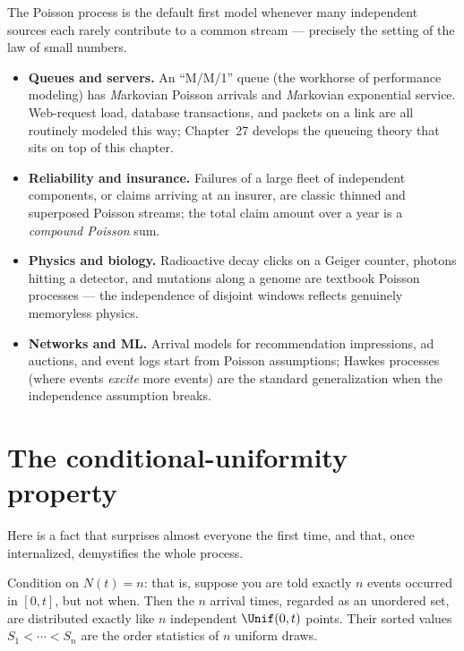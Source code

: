 \begin{applicationbox}
The Poisson process is the default first model whenever many independent sources
each rarely contribute to a common stream --- precisely the setting of the law of
small numbers.
\begin{itemize}
\item \textbf{Queues and servers.} An ``M/M/1'' queue (the workhorse of
performance modeling) has \emph{M}arkovian Poisson arrivals and \emph{M}arkovian
exponential service. Web-request load, database transactions, and packets on a
link are all routinely modeled this way; Chapter~27 develops the queueing theory
that sits on top of this chapter.
\item \textbf{Reliability and insurance.} Failures of a large fleet of
independent components, or claims arriving at an insurer, are classic thinned and
superposed Poisson streams; the total claim amount over a year is a
\emph{compound Poisson} sum.
\item \textbf{Physics and biology.} Radioactive decay clicks on a Geiger counter,
photons hitting a detector, and mutations along a genome are textbook Poisson
processes --- the independence of disjoint windows reflects genuinely
memoryless physics.
\item \textbf{Networks and ML.} Arrival models for recommendation impressions, ad
auctions, and event logs start from Poisson assumptions; Hawkes processes (where
events \emph{excite} more events) are the standard generalization when the
independence assumption breaks.
\end{itemize}
\end{applicationbox}

\section{The conditional-uniformity property}
\label{ch25:uniformity}

Here is a fact that surprises almost everyone the first time, and that, once
internalized, demystifies the whole process.

\begin{theorem}
\label{ch25:thm-uniformity}
Condition on $N(t)=n$: that is, suppose you are told exactly $n$ events occurred
in $[0,t]$, but not when. Then the $n$ arrival times, regarded as an unordered
set, are distributed exactly like $n$ independent $\Unif(0,t)$ points. Their
sorted values $S_1 < \cdots < S_n$ are the order statistics of $n$ uniform draws.
\end{theorem}


